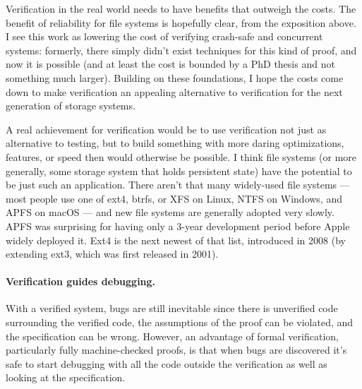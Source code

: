 Verification in the real world needs to have benefits that outweigh the costs.
The benefit of reliability for file systems is hopefully clear, from the
exposition above. I see this work as lowering the cost of verifying crash-safe
and concurrent systems: formerly, there simply didn't exist techniques for this
kind of proof, and now it is possible (and at least the cost is bounded by a PhD
thesis and not something much larger). Building on these foundations, I hope the
costs come down to make verification an appealing alternative to verification
for the next generation of storage systems.

A real achievement for verification would be to use verification not just as
alternative to testing, but to build something with more daring optimizations,
features, or speed then would otherwise be possible. I think file systems (or
more generally, some storage system that holds persistent state) have the
potential to be just such an application. There aren't that many widely-used
file systems --- most people use one of ext4, btrfs, or XFS on Linux, NTFS on
Windows, and APFS on macOS --- and new file systems are generally adopted very
slowly. APFS was surprising for having only a 3-year development period before
Apple widely deployed it. Ext4 is the next newest of that list, introduced in
2008 (by extending ext3, which was first released in 2001).


\paragraph{Verification guides debugging.} With a verified system, bugs are
still inevitable since there is unverified code surrounding the verified code,
the assumptions of the proof can be violated, and the specification can be
wrong. However, an advantage of formal verification, particularly fully
machine-checked proofs, is that when bugs are discovered it's safe to start
debugging with all the code outside the verification as well as looking at the
specification.

